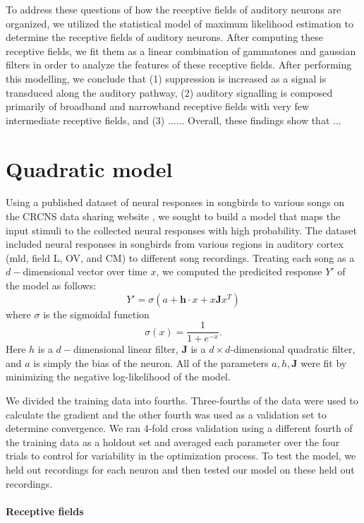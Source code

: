 \documentclass{article}
\begin{document}
To address these questions of how the receptive fields of auditory neurons are organized, we utilized the statistical model of maximum likelihood estimation to determine the receptive fields of auditory neurons. After computing these receptive fields, we fit them as a linear combination of gammatones and gaussian filters in order to analyze the features of these receptive fields. After performing this modelling, we conclude that (1) suppression is increased as a signal is transduced along the auditory pathway, (2) auditory signalling is composed primarily of broadband and narrowband receptive fields with very few intermediate receptive fields, and (3) ...... Overall, these findings show that ...

\section{Quadratic model}

Using a published dataset of neural responses in songbirds to various songs on the CRCNS data 
sharing website \cite{songbirddataset}, we sought to build a model that maps the input stimuli to the 
collected neural responses with high probability. The dataset included neural responses in songbirds 
from various regions in auditory cortex (mld, field L, OV, and CM) to different song recordings. Treating 
each song as a $d-$dimensional vector over time $x$, we computed the predicited response $Y'$ of the 
model as follows:
$$
Y' = \sigma(a + \mathbf{h}\cdot x + x\mathbf{J}x^T)
$$ where $\sigma$ is the sigmoidal function
$$\sigma(x) = \frac{1}{1+e^{-x}}.$$ Here $h$ is a $d-$dimensional linear filter, $\mathbf{J}$ is a $d\times d$-dimensional quadratic filter, and $a$ is simply the bias of the neuron. All of the parameters $a, h, \mathbf{J}$ were fit by minimizing the negative log-likelihood of the model.

We divided the training data into fourths. Three-fourths of the data were used to calculate the gradient and the other fourth was used as a validation set to determine convergence. We ran 4-fold cross validation using a different fourth of the training data as a holdout set and averaged each parameter over the four trials to control for variability in the optimization process. To test the model, we held out recordings for each neuron and then tested our model on these held out recordings.

\paragraph{Receptive fields}
\end{document}
